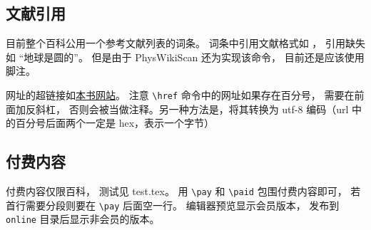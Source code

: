 
\subsection{文献引用}
目前整个百科公用一个参考文献列表的词条。 词条中引用文献格式如 \cite{PhysWiki}， 引用缺失如 “地球是圆的\needCite”。 但是由于 PhysWikiScan 还为实现该命令， 目前还是应该使用脚注。

网址的超链接如\href{https://wuli.wiki}{本书网站}。 注意 \verb|\href| 命令中的网址如果存在百分号， 需要在前面加反斜杠， 否则会被当做注释。另一种方法是，将其转换为 utf-8 编码（url 中的百分号后面两个一定是 hex，表示一个字节）

\subsection{付费内容}
付费内容仅限百科， 测试见 test.tex。 用 \verb|\pay| 和 \verb|\paid| 包围付费内容即可， 若首行需要分段则要在 \verb|\pay| 后面空一行。 编辑器预览显示会员版本， 发布到 \verb|online| 目录后显示非会员的版本。
